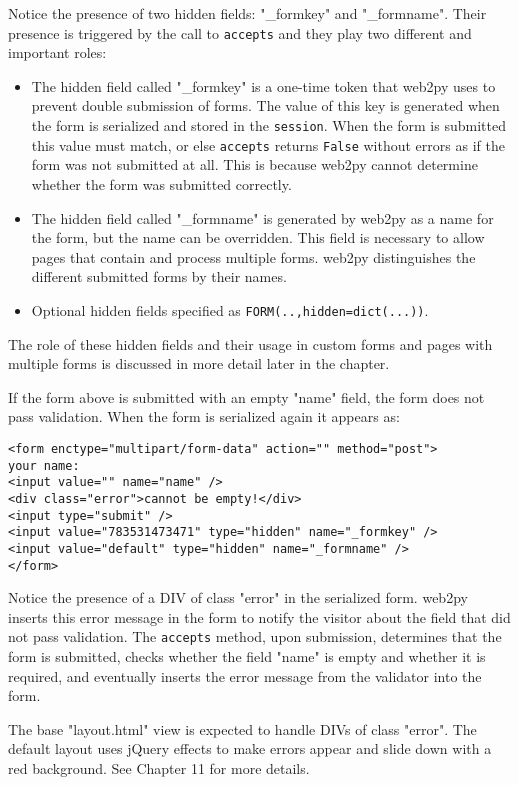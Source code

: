 \documentclass[justified,sixbynine,notoc]{tufte-book}
\def\ft{\small\tt}
\begin{document}
\begin{fullwidth}
Notice the presence of two hidden fields: "\_formkey" and "\_formname". Their presence is triggered by the call to {\ft accepts} and they play two different and important roles:
\begin{itemize}
\item The hidden field called "\_formkey" is a one-time token that web2py uses to prevent double submission of forms. The value of this key is generated when the form is serialized and stored in the {\ft session}. When the form is submitted this value must match, or else {\ft accepts} returns {\ft False} without errors as if the form was not submitted at all. This is because web2py cannot determine whether the form was submitted correctly.

\item The hidden field called "\_formname" is generated by web2py as a name for the form, but the name can be overridden. This field is necessary to allow pages that contain and process multiple forms. web2py distinguishes the different submitted forms by their names.

\item Optional hidden fields specified as {\ft FORM(..,hidden=dict(...))}.
\end{itemize}

The role of these hidden fields and their usage in custom forms and pages with multiple forms is discussed in more detail later in the chapter.

If the form above is submitted with an empty "name" field, the form does not pass validation. When the form is serialized again it appears as:
\begin{lstlisting}[keywords={}]
<form enctype="multipart/form-data" action="" method="post">
your name:
<input value="" name="name" />
<div class="error">cannot be empty!</div>
<input type="submit" />
<input value="783531473471" type="hidden" name="_formkey" />
<input value="default" type="hidden" name="_formname" />
</form>
\end{lstlisting}

Notice the presence of a DIV of class "error" in the serialized form. web2py inserts this error message in the form to notify the visitor about the field that did not pass validation. The {\ft accepts} method, upon submission, determines that the form is submitted, checks whether the field "name" is empty and whether it is required, and eventually inserts the error message from the validator into the form.

The base "layout.html" view is expected to handle DIVs of class "error". The default layout uses jQuery effects to make errors appear and slide down with a red background. See Chapter 11 for more details.


\end{fullwidth}
\end{document}
